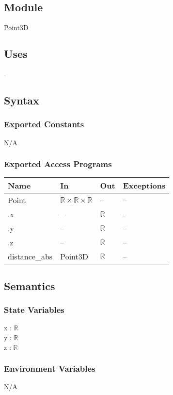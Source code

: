 \documentclass[12pt, titlepage]{article}
\begin{document}
\subsection{Module}
Point3D

\subsection{Uses} -

\subsection{Syntax}
\subsubsection{Exported Constants}
N/A
\subsubsection{Exported Access Programs}
\begin{center}
	\begin{tabular}{p{4cm} p{2cm} p{2cm} p{4cm}}
		\hline
		\textbf{Name} & \textbf{In} & \textbf{Out} & \textbf{Exceptions} \\
		\hline
		Point & $\mathbb{R} \times \mathbb{R} \times \mathbb{R}$ & -- & -- \\
		.x & -- & $\mathbb{R}$ & -- \\
		.y & -- & $\mathbb{R}$ & -- \\		
		.z & -- & $\mathbb{R}$ & -- \\
		distance\_abs & Point3D & $\mathbb{R}$ & -- \\
		\hline
	\end{tabular}
\end{center}

\subsection{Semantics}
\subsubsection{State Variables}
x : $\mathbb{R}$ \\
y : $\mathbb{R}$ \\
z : $\mathbb{R}$ \\

\subsubsection{Environment Variables}
N/A
\end{document}
